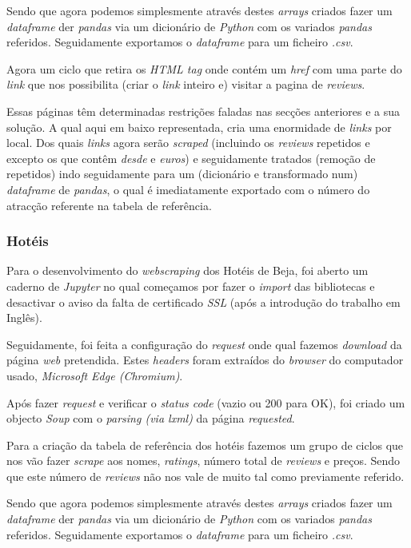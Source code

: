 Sendo que agora podemos simplesmente através destes \textit{arrays} criados fazer um \textit{dataframe} der \textit{pandas} via um dicionário de \textit{Python} com os variados \textit{pandas} referidos. Seguidamente exportamos o \textit{dataframe} para um ficheiro \textit{.csv}.

Agora um ciclo que retira os \textit{HTML tag} onde  contém um \textit{href} com uma parte do \textit{link} que nos possibilita (criar o \textit{link} inteiro e) visitar a pagina de \textit{reviews}.

Essas páginas têm determinadas restrições faladas nas secções anteriores e a sua solução. A qual aqui em baixo representada, cria uma enormidade de \textit{links} por local.
Dos quais \textit{links} agora serão \textit{scraped} (incluindo os \textit{reviews} repetidos e excepto os que contêm \textit{desde} e \textit{euros}) e seguidamente tratados (remoção de repetidos) indo seguidamente para um (dicionário e transformado num) \textit{dataframe} de \textit{pandas}, o qual é imediatamente exportado com o número do atracção referente na tabela de referência.
\subsubsection{Hotéis}

Para o desenvolvimento do \textit{webscraping} dos Hotéis de Beja, foi aberto um caderno de \textit{Jupyter} no qual começamos por fazer o \textit{import} das bibliotecas e desactivar o aviso da falta de certificado \textit{SSL} (após a introdução do trabalho em Inglês).

Seguidamente, foi feita a configuração do \textit{request} onde qual fazemos \textit{download} da página \textit{web} pretendida. Estes \textit{headers} foram extraídos do \textit{browser} do computador usado, \textit{Microsoft Edge (Chromium)}.

Após fazer \textit{request} e verificar o \textit{status code} (vazio ou 200 para OK), foi criado um objecto \textit{Soup} com o \textit{parsing (via lxml)} da página \textit{requested}.

Para a criação da tabela de referência dos hotéis fazemos um grupo de ciclos que nos vão fazer \textit{scrape} aos nomes, \textit{ratings}, número total de \textit{reviews} e preços. Sendo que este número de \textit{reviews} não nos vale de muito tal como previamente referido.

Sendo que agora podemos simplesmente através destes \textit{arrays} criados fazer um \textit{dataframe} der \textit{pandas} via um dicionário de \textit{Python} com os variados \textit{pandas} referidos. Seguidamente exportamos o \textit{dataframe} para um ficheiro \textit{.csv}.

